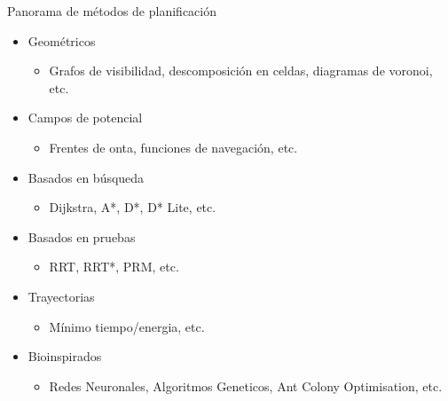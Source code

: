 \documentclass[
	11pt, %
]{beamer}
\begin{document}
\begin{frame}{Panorama de m\'{e}todos de planificaci\'{o}n}
  \begin{itemize}
  \item Geom\'{e}tricos
    \begin{itemize}
    \item Grafos de visibilidad, descomposici\'{o}n en celdas, diagramas de voronoi, etc.
    \end{itemize}
  \item Campos de potencial
    \begin{itemize}
    \item Frentes de onta, funciones de navegaci\'{o}n, etc.
    \end{itemize}
  \item Basados en b\'{u}squeda
    \begin{itemize}
    \item Dijkstra, A*, D*, D* Lite, etc.
    \end{itemize}
  \item Basados en pruebas
    \begin{itemize}
    \item RRT, RRT*, PRM, etc.
    \end{itemize}
  \item Trayectorias
    \begin{itemize}
    \item M\'{i}nimo tiempo/energia, etc.
    \end{itemize}
  \item Bioinspirados
    \begin{itemize}
    \item Redes Neuronales, Algoritmos Geneticos, Ant Colony Optimisation, etc.
    \end{itemize}
  \end{itemize}
\end{frame}
\end{document}
